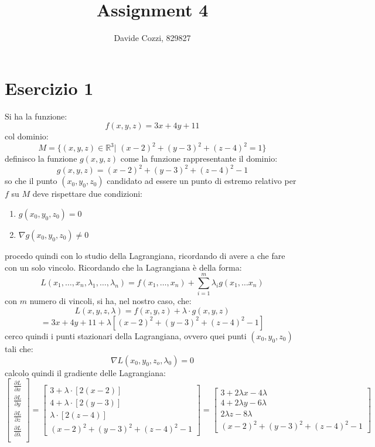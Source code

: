 \documentclass[a4paper,12pt, oneside]{book}
\title{Assignment 4}
\author{Davide Cozzi, 829827}
\date{}
\begin{document}
\maketitle

\newtheorem{teorema}{Teorema}
\newtheorem{definizione}{Definizione}
\newtheorem{esempio}{Esempio}
\newtheorem{corollario}{Corollario}
\newtheorem{lemma}{Lemma}
\newtheorem{osservazione}{Osservazione}
\newtheorem{nota}{Nota}
\newtheorem{esercizio}{Esercizio}

\renewcommand{\chaptermark}[1]{%
  \markboth{\chaptername
    \ \thechapter.\ #1}{}}
\renewcommand{\sectionmark}[1]{\markright{\thesection.\ #1}}
\chapter{Esercizio 1}
Si ha la funzione:
\[f(x,y,z)=3x+4y+11\]
col dominio:
\[M=\{(x,y,z)\in\mathbb{R}^3|\,\,(x-2)^2+(y-3)^2+(z-4)^2=1\}\]
definisco la funzione $g(x,y,z)$ come la funzione rappresentante il dominio:
\[g(x,y,z)=(x-2)^2+(y-3)^2+(z-4)^2-1\]
so che il punto $(x_0,y_0,z_0)$ candidato ad essere un punto di
estremo relativo per $f$ su $M$ deve rispettare due condizioni:
\begin{enumerate}
  \item $g(x_0,y_0,z_0)=0$
  \item $\nabla g(x_0,y_0,z_0)\neq 0$
\end{enumerate}
procedo quindi con lo studio della Lagrangiana, ricordando di avere a
che fare con un solo vincolo. Ricordando che la Lagrangiana è della
forma:
\[L(x_1,\ldots,x_n,\lambda_1,\ldots,\lambda_n)=f(x_1,\ldots,x_n)+\sum_{i=1}^m
  \lambda_ig(x_1,\ldots x_n)\]
con $m$ numero di vincoli, si ha, nel nostro caso, che:
\[L(x,y,z,\lambda)=f(x,y,z)+\lambda\cdot g(x,y,z)\]
\[=3x+4y+11+\lambda[(x-2)^2+(y-3)^2+(z-4)^2-1]\]
cerco quindi i punti stazionari della Lagrangiana, ovvero quei punti
$(x_0,y_0,z_0)$ tali che:
\[\nabla L(x_0,y_0,z_o,\lambda_0)=0\]
calcolo quindi il gradiente delle Lagrangiana:
\[\left[
    \begin{matrix}
      \frac{\partial L}{\partial x}\\
      \frac{\partial L}{\partial y}\\
      \frac{\partial L}{\partial z}\\
      \frac{\partial L}{\partial \lambda}\\
    \end{matrix}
  \right]=\left[
    \begin{matrix}
      3+\lambda\cdot [2(x-2)]\\
      4+\lambda\cdot [2(y-3)]\\
      \lambda\cdot [2(z-4)]\\
      (x-2)^2+(y-3)^2+(z-4)^2-1
    \end{matrix}
  \right]=\left[
    \begin{matrix}
      3+2\lambda x-4\lambda\\
      4+2\lambda y-6\lambda\\
      2\lambda z-8\lambda\\
      (x-2)^2+(y-3)^2+(z-4)^2-1
    \end{matrix}
  \right]
\]
\end{document}
